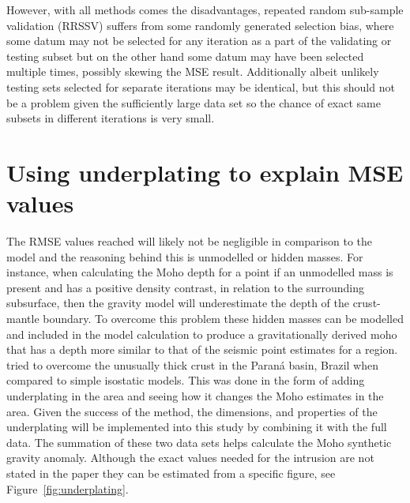 However, with all methods comes the disadvantages, repeated random sub-sample validation (RRSSV) suffers from some randomly generated selection bias, where some datum may not be selected for any iteration as a part of the validating or testing subset but on the other hand some datum may have been selected multiple times, possibly skewing the MSE result. Additionally albeit unlikely testing sets selected for separate iterations may be identical, but this should not be a problem given the sufficiently large data set so the chance of exact same subsets in different iterations is very small.
\section{Using underplating to explain MSE values}
The RMSE values reached will likely not be negligible in comparison to the model and the reasoning behind this is unmodelled or hidden masses. For instance, when calculating the Moho depth for a point if an unmodelled mass is present and has a positive density contrast, in relation to the surrounding subsurface, then the gravity model will underestimate the depth of the crust-mantle boundary. To overcome this problem these hidden masses can be modelled and included in the model calculation to produce a gravitationally derived moho that has a depth more similar to that of the seismic point estimates for a region. \cite{Mariani2013} tried to overcome the unusually thick crust in the Paraná basin, Brazil when compared to simple isostatic models. This was done in the form of adding underplating in the area and seeing how it changes the Moho estimates in the area. Given the success of the method, the dimensions, and properties of the underplating will be implemented into this study by combining it with the full data. The summation of these two data sets helps calculate the Moho synthetic gravity anomaly. Although the exact values needed for the intrusion are not stated in the paper they can be estimated from a specific figure, see Figure~\ref{fig:underplating}.
